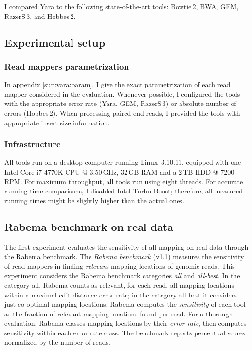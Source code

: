 I compared Yara to the following state-of-the-art tools: Bowtie\,2, BWA, GEM, RazerS\,3, and Hobbes\,2.

\subsection{Experimental setup}

\subsubsection{Read mappers parametrization}

In appendix \ref{sup:yara:param}, I give the exact parametrization of each read mapper considered in the evaluation.
Whenever possible, I configured the tools with the appropriate error rate (Yara, GEM, RazerS\,3) or absolute number of errors (Hobbes\,2).
When processing paired-end reads, I provided the tools with appropriate insert size information.

\subsubsection{Infrastructure}

All tools run on a desktop computer running Linux~3.10.11, equipped with one Intel\textsuperscript{\textregistered} Core i7-4770K CPU @ 3.50\,GHz, 32\,GB RAM and a 2\,TB HDD @ 7200\,RPM.
For maximum throughput, all tools run using eight threads.
For accurate running time comparisons, I disabled Intel Turbo Boost; therefore, all measured running times might be slightly higher than the actual ones.

\subsection{Rabema benchmark on real data}

The first experiment evaluates the sensitivity of all-mapping on real data through the Rabema benchmark.
The \emph{Rabema benchmark} \citep{Holtgrewe2011} (v1.1) measures the sensitivity of read mappers in finding \emph{relevant} mapping locations of genomic reads.
This experiment considers the Rabema benchmark categories \emph{all} and \emph{all-best}.
In the category all, Rabema counts as relevant, for each read, all mapping locations within a maximal edit distance error rate; in the category all-best it considers just co-optimal mapping locations.
Rabema computes the \emph{sensitivity} of each tool as the fraction of relevant mapping locations found per read.
For a thorough evaluation, Rabema classes mapping locations by their \emph{error rate}, then computes sensitivity within each error rate class.
The benchmark reports percentual scores normalized by the number of reads.

